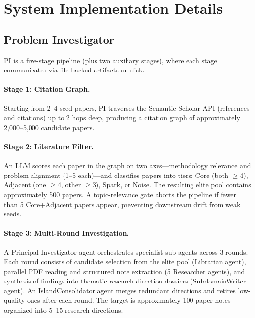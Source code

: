 
\section{System Implementation Details}
\label{app:system_details}

\subsection{Problem Investigator}
\label{app:pi_details}

PI is a five-stage pipeline (plus two auxiliary stages), where each stage communicates via file-backed artifacts on disk.

\paragraph{Stage 1: Citation Graph.}
Starting from 2--4 seed papers, PI traverses the Semantic Scholar API (references and citations) up to 2 hops deep, producing a citation graph of approximately 2{,}000--5{,}000 candidate papers. %

\paragraph{Stage 2: Literature Filter.}
An LLM scores each paper in the graph on two axes---methodology relevance and problem alignment (1--5 each)---and classifies papers into tiers: Core (both $\geq$4), Adjacent (one $\geq$4, other $\geq$3), Spark, or Noise. The resulting elite pool contains approximately 500 papers. A topic-relevance gate aborts the pipeline if fewer than 5 Core+Adjacent papers appear, preventing downstream drift from weak seeds.

\paragraph{Stage 3: Multi-Round Investigation.}
A Principal Investigator agent orchestrates specialist sub-agents across 3 rounds. Each round consists of candidate selection from the elite pool (Librarian agent), parallel PDF reading and structured note extraction (5 Researcher agents), and synthesis of findings into thematic research direction dossiers (SubdomainWriter agent). An IslandConsolidator agent merges redundant directions and retires low-quality ones after each round. The target is approximately 100 paper notes organized into 5--15 research directions. %

